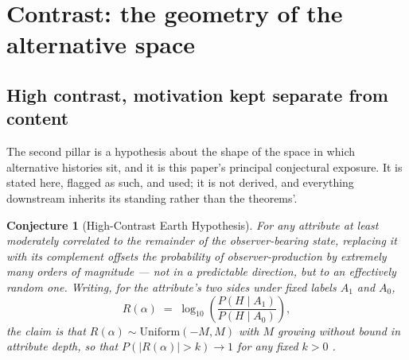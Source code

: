 \documentclass[11pt]{article}
\newtheorem{conjecture}{Conjecture}
\theoremstyle{definition}
\begin{document}
\section{Contrast: the geometry of the alternative space}
\label{sec:contrast}

\subsection{High contrast, motivation kept separate from content}
\label{sec:contrast-hceh}

The second pillar is a hypothesis about the shape of the space in which alternative histories sit, and it is this paper's principal conjectural exposure. It is stated here, flagged as such, and used; it is not derived, and everything downstream inherits its standing rather than the theorems'.

\begin{conjecture}[High-Contrast Earth Hypothesis]
\label{conj:hceh}
For any attribute at least moderately correlated to the remainder of the observer-bearing state, replacing it with its complement offsets the probability of observer-production by extremely many orders of magnitude --- not in a predictable direction, but to an effectively random one. Writing, for the attribute's two sides under fixed labels $A_1$ and $A_0$,
\begin{equation}
\label{eq:contrast-ratio}
R(\alpha) \;=\; \log_{10}\!\left( \frac{P(H \mid A_1)}{P(H \mid A_0)} \right),
\end{equation}
the claim is that $R(\alpha) \sim \mathrm{Uniform}(-M, M)$ with $M$ growing without bound in attribute depth, so that $P(|R(\alpha)| > k) \to 1$ for any fixed $k > 0$ \cite{Nexus}.
\end{conjecture}
\end{document}
